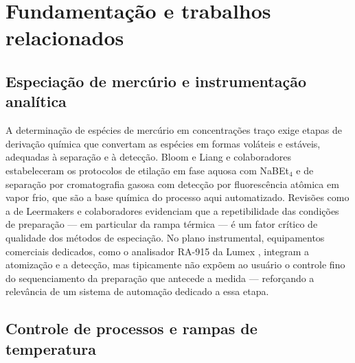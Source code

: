 \section{Fundamenta\c{c}\~ao e trabalhos relacionados}
\label{sec:fund}

\subsection{Especia\c{c}\~ao de merc\'urio e instrumenta\c{c}\~ao anal\'itica}

A determina\c{c}\~ao de esp\'ecies de merc\'urio em concentra\c{c}\~oes tra\c{c}o
exige etapas de deriva\c{c}\~ao qu\'imica que convertam as esp\'ecies em formas
vol\'ateis e est\'aveis, adequadas \`a separa\c{c}\~ao e \`a detec\c{c}\~ao.
Bloom \cite{bloom1989} e Liang e colaboradores \cite{liang1994} estabeleceram os
protocolos de etila\c{c}\~ao em fase aquosa com NaBEt$_4$ e de separa\c{c}\~ao
por cromatografia gasosa com detec\c{c}\~ao por fluoresc\^encia at\^omica em vapor
frio, que s\~ao a base qu\'imica do processo aqui automatizado. Revis\~oes como a
de Leermakers e colaboradores \cite{leermakers2005} evidenciam que a
repetibilidade das condi\c{c}\~oes de prepara\c{c}\~ao --- em particular da rampa
t\'ermica --- \'e um fator cr\'itico de qualidade dos m\'etodos de
especia\c{c}\~ao. No plano instrumental, equipamentos comerciais dedicados, como
o analisador RA-915 da Lumex \cite{lumex}, integram a atomiza\c{c}\~ao e a
detec\c{c}\~ao, mas tipicamente n\~ao exp\~oem ao usu\'ario o controle fino do
sequenciamento da prepara\c{c}\~ao que antecede a medida --- refor\c{c}ando a
relev\^ancia de um sistema de automa\c{c}\~ao dedicado a essa etapa.

\subsection{Controle de processos e rampas de temperatura}

